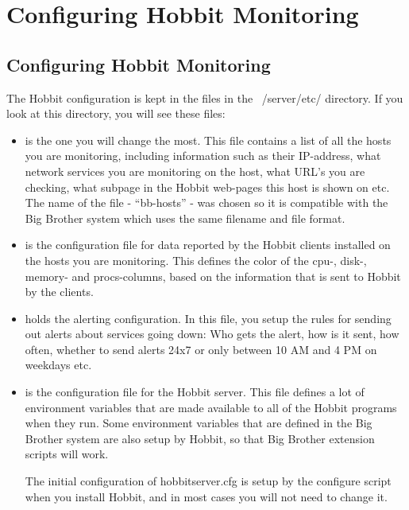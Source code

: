 \chapter{Configuring Hobbit Monitoring}
\section{Configuring Hobbit Monitoring}


 The Hobbit configuration is kept in the files in the ~/server/etc/
 directory. If you look at this directory, you will see these files:

\begin{itemize}
\item {} is the one you will change the most. This file contains
  a list of all the hosts you are monitoring, including information
  such as their IP-address, what network services you are monitoring
  on the host, what URL's you are checking, what subpage in the Hobbit
  web-pages this host is shown on etc. The name of the file -
  ``bb-hosts'' - was chosen so it is compatible with the Big Brother
  system which uses the same filename and file format.

\item {} is the configuration file for data reported
  by the Hobbit clients installed on the hosts you are
  monitoring. This defines the color of the cpu-, disk-, memory- and
  procs-columns, based on the information that is sent to Hobbit by
  the clients.

\item {} holds the alerting configuration. In this
  file, you setup the rules for sending out alerts about services
  going down: Who gets the alert, how is it sent, how often, whether
  to send alerts 24x7 or only between 10 AM and 4 PM on weekdays etc.

\item {} is the configuration file for the Hobbit
  server. This file defines a lot of environment variables that are
  made available to all of the Hobbit programs when they run. Some
  environment variables that are defined in the Big Brother system are
  also setup by Hobbit, so that Big Brother extension scripts will
  work. 

The initial configuration of hobbitserver.cfg is setup by the
configure script when you install Hobbit, and in most cases you will
not need to change it.


\end{itemize}
